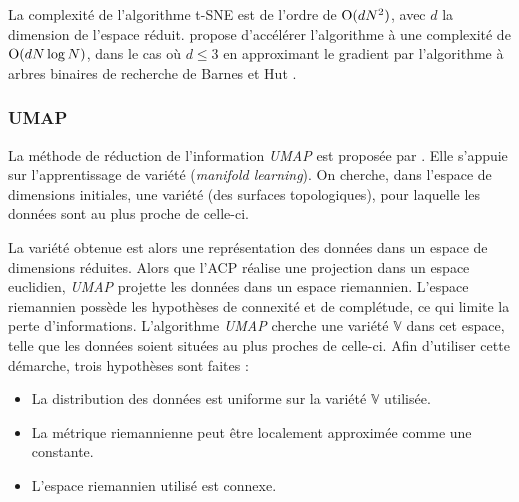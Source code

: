 La complexité de l'algorithme t-SNE est de l'ordre de $\operatorname{O}(d N^2)$, avec $d$ la dimension de l'espace réduit.
\cite{maaten_accelerating_2014} propose d'accélérer l'algorithme à une complexité de $\operatorname{O}(d N \log N)$, dans le cas où $d \le 3$ en approximant le gradient par l'algorithme à arbres binaires de recherche de Barnes et Hut \cite{barnes_hierarchical_1986}.

\subsubsection{UMAP} \label{subsubsec:umap}
La méthode de réduction de l'information \textit{UMAP} est proposée par \cite{mcinnes_umap_2018, mcinnes_umap_2018a}.
Elle s'appuie sur l'apprentissage de variété (\textit{manifold learning}).
On cherche, dans l'espace de dimensions initiales, une variété (des surfaces topologiques), pour laquelle les données sont au plus proche de celle-ci.







La variété obtenue est alors une représentation des données dans un espace de dimensions réduites.
Alors que l'ACP réalise une projection dans un espace euclidien, \textit{UMAP} projette les données dans un espace riemannien.
L'espace riemannien possède les hypothèses de connexité et de complétude, ce qui limite la perte d'informations.
L'algorithme \textit{UMAP} cherche une variété $\mathbb{V}$ dans cet espace, telle que les données soient situées au plus proches de celle-ci.
Afin d'utiliser cette démarche, trois hypothèses sont faites :
\begin{itemize}
\item La distribution des données est uniforme sur la variété $\mathbb{V}$ utilisée.
\item La métrique riemannienne peut être localement approximée comme une constante.
\item L'espace riemannien utilisé est connexe.
\end{itemize}



